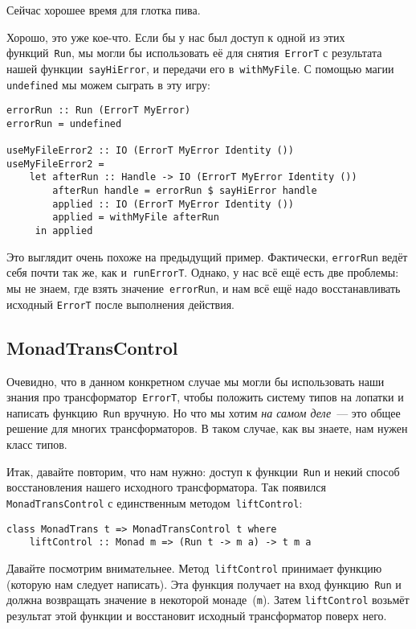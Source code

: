 \begin{remark}
Сейчас хорошее время для глотка пива.
\end{remark}

Хорошо, это уже кое-что. Если бы у нас был доступ к одной из этих
функций~\lstinline'Run', мы могли бы использовать её для
снятия~\lstinline'ErrorT' с результата нашей функции~\lstinline'sayHiError', и
передачи его в~\lstinline'withMyFile'. С помощью магии \lstinline'undefined' мы
можем сыграть в эту игру:

\begin{lstlisting}
errorRun :: Run (ErrorT MyError)
errorRun = undefined

useMyFileError2 :: IO (ErrorT MyError Identity ())
useMyFileError2 =
    let afterRun :: Handle -> IO (ErrorT MyError Identity ())
        afterRun handle = errorRun $ sayHiError handle
        applied :: IO (ErrorT MyError Identity ())
        applied = withMyFile afterRun
     in applied
\end{lstlisting}

Это выглядит очень похоже на предыдущий пример. Фактически,
\lstinline'errorRun' ведёт себя почти так же, как и~\lstinline'runErrorT'.
Однако, у нас всё ещё есть две проблемы: мы не знаем, где взять
значение~\lstinline'errorRun', и нам всё ещё надо восстанавливать исходный
\lstinline'ErrorT' после выполнения действия.

\subsection{MonadTransControl}
Очевидно, что в данном конкретном случае мы могли бы использовать наши знания
про трансформатор~\lstinline'ErrorT', чтобы положить систему типов на лопатки и
написать функцию~\lstinline'Run' вручную. Но что мы хотим \emph{на самом
 деле}~--- это общее решение для многих трансформаторов. В таком случае, как
вы знаете, нам нужен класс типов.

Итак, давайте повторим, что нам нужно: доступ к функции~\lstinline'Run' и некий
способ восстановления нашего исходного трансформатора. Так появился
\lstinline'MonadTransControl' с единственным методом~\lstinline'liftControl':

\begin{lstlisting}
class MonadTrans t => MonadTransControl t where
    liftControl :: Monad m => (Run t -> m a) -> t m a
\end{lstlisting}

Давайте посмотрим внимательнее. Метод~\lstinline'liftControl' принимает функцию
(которую нам следует написать). Эта функция получает на вход
функцию~\lstinline'Run' и должна возвращать значение в некоторой
монаде~(\lstinline'm'). Затем \lstinline'liftControl' возьмёт результат этой
функции и восстановит исходный трансформатор поверх него.

